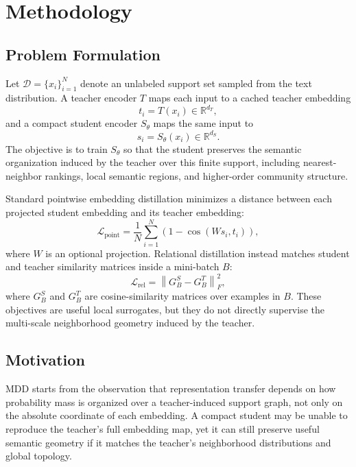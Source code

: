 \section{Methodology}
\label{sec:method}

\subsection{Problem Formulation}

Let $\mathcal{D}=\{x_i\}_{i=1}^{N}$ denote an unlabeled support set sampled from the text distribution. A teacher encoder $T$ maps each input to a cached teacher embedding
\begin{equation}
    t_i = T(x_i) \in \mathbb{R}^{d_T},
\end{equation}
and a compact student encoder $S_{\theta}$ maps the same input to
\begin{equation}
    s_i = S_{\theta}(x_i) \in \mathbb{R}^{d_S}.
\end{equation}
The objective is to train $S_{\theta}$ so that the student preserves the semantic organization induced by the teacher over this finite support, including nearest-neighbor rankings, local semantic regions, and higher-order community structure.

Standard pointwise embedding distillation minimizes a distance between each projected student embedding and its teacher embedding:
\begin{equation}
    \mathcal{L}_{\mathrm{point}}
    =
    \frac{1}{N}
    \sum_{i=1}^{N}
    \left(1-\cos(Ws_i,t_i)\right),
\end{equation}
where $W$ is an optional projection. Relational distillation instead matches student and teacher similarity matrices inside a mini-batch $B$:
\begin{equation}
    \mathcal{L}_{\mathrm{rel}}
    =
    \left\|
    G_B^S - G_B^T
    \right\|_F^2,
\end{equation}
where $G_B^S$ and $G_B^T$ are cosine-similarity matrices over examples in $B$. These objectives are useful local surrogates, but they do not directly supervise the multi-scale neighborhood geometry induced by the teacher.

\subsection{Motivation}

MDD starts from the observation that representation transfer depends on how probability mass is organized over a teacher-induced support graph, not only on the absolute coordinate of each embedding. A compact student may be unable to reproduce the teacher's full embedding map, yet it can still preserve useful semantic geometry if it matches the teacher's neighborhood distributions and global topology.

